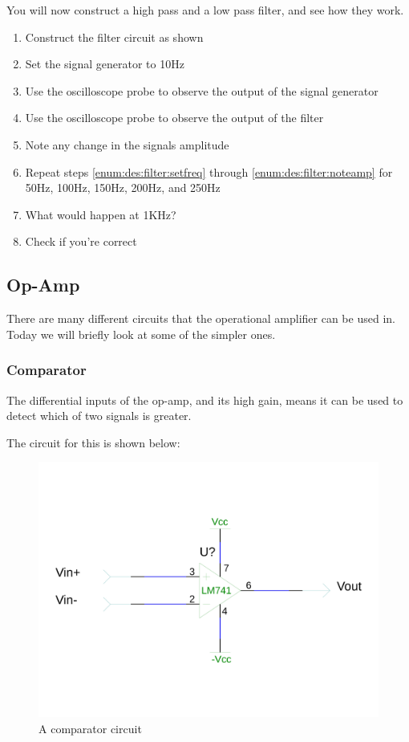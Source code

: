 You will now construct a high pass and a low pass filter, and see how they work.

\begin{enumerate}
\item Construct the filter circuit as shown
\item \label{enum:des:filter:setfreq}Set the signal generator to 10Hz
\item Use the oscilloscope probe to observe the output of the signal generator
\item Use the oscilloscope probe to observe the output of the filter
\item \label{enum:des:filter:noteamp}Note any change in the signals amplitude
\item Repeat steps \ref{enum:des:filter:setfreq} through \ref{enum:des:filter:noteamp} for 50Hz, 100Hz, 150Hz, 200Hz, and 250Hz
\item What would happen at 1KHz?
\item Check if you're correct
\end{enumerate}

\subsection{Op-Amp}
There are many different circuits that the operational amplifier can be used in.
Today we will briefly look at some of the simpler ones.

\subsubsection{Comparator}
The differential inputs of the op-amp, and its high gain, means it can be used to detect which of two signals is greater.

The circuit for this is shown below:

\begin{figure}[H]
	\centering
	\includegraphics[width=\textwidth]{./images/comparator.png}
	\caption{A comparator circuit}
	\label{fig:comparator}
\end{figure}

